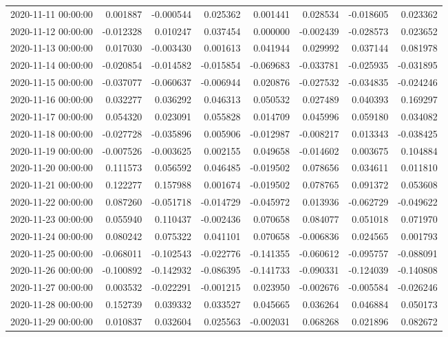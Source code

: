 \begin{tabular}{lrrrrrrr}
2020-11-11 00:00:00 & 0.001887 & -0.000544 & 0.025362 & 0.001441 & 0.028534 & -0.018605 & 0.023362 \\
2020-11-12 00:00:00 & -0.012328 & 0.010247 & 0.037454 & 0.000000 & -0.002439 & -0.028573 & 0.023652 \\
2020-11-13 00:00:00 & 0.017030 & -0.003430 & 0.001613 & 0.041944 & 0.029992 & 0.037144 & 0.081978 \\
2020-11-14 00:00:00 & -0.020854 & -0.014582 & -0.015854 & -0.069683 & -0.033781 & -0.025935 & -0.031895 \\
2020-11-15 00:00:00 & -0.037077 & -0.060637 & -0.006944 & 0.020876 & -0.027532 & -0.034835 & -0.024246 \\
2020-11-16 00:00:00 & 0.032277 & 0.036292 & 0.046313 & 0.050532 & 0.027489 & 0.040393 & 0.169297 \\
2020-11-17 00:00:00 & 0.054320 & 0.023091 & 0.055828 & 0.014709 & 0.045996 & 0.059180 & 0.034082 \\
2020-11-18 00:00:00 & -0.027728 & -0.035896 & 0.005906 & -0.012987 & -0.008217 & 0.013343 & -0.038425 \\
2020-11-19 00:00:00 & -0.007526 & -0.003625 & 0.002155 & 0.049658 & -0.014602 & 0.003675 & 0.104884 \\
2020-11-20 00:00:00 & 0.111573 & 0.056592 & 0.046485 & -0.019502 & 0.078656 & 0.034611 & 0.011810 \\
2020-11-21 00:00:00 & 0.122277 & 0.157988 & 0.001674 & -0.019502 & 0.078765 & 0.091372 & 0.053608 \\
2020-11-22 00:00:00 & 0.087260 & -0.051718 & -0.014729 & -0.045972 & 0.013936 & -0.062729 & -0.049622 \\
2020-11-23 00:00:00 & 0.055940 & 0.110437 & -0.002436 & 0.070658 & 0.084077 & 0.051018 & 0.071970 \\
2020-11-24 00:00:00 & 0.080242 & 0.075322 & 0.041101 & 0.070658 & -0.006836 & 0.024565 & 0.001793 \\
2020-11-25 00:00:00 & -0.068011 & -0.102543 & -0.022776 & -0.141355 & -0.060612 & -0.095757 & -0.088091 \\
2020-11-26 00:00:00 & -0.100892 & -0.142932 & -0.086395 & -0.141733 & -0.090331 & -0.124039 & -0.140808 \\
2020-11-27 00:00:00 & 0.003532 & -0.022291 & -0.001215 & 0.023950 & -0.002676 & -0.005584 & -0.026246 \\
2020-11-28 00:00:00 & 0.152739 & 0.039332 & 0.033527 & 0.045665 & 0.036264 & 0.046884 & 0.050173 \\
2020-11-29 00:00:00 & 0.010837 & 0.032604 & 0.025563 & -0.002031 & 0.068268 & 0.021896 & 0.082672 \\

\end{tabular}
